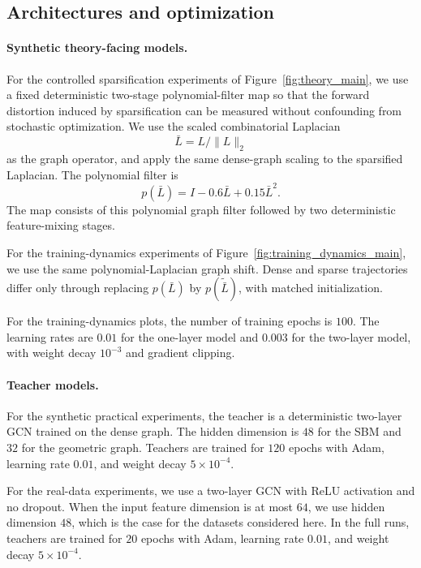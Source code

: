 \documentclass{article}
\begin{document}
\subsection{Architectures and optimization}
\label{app:impl}
\paragraph{Synthetic theory-facing models.}
For the controlled sparsification experiments of Figure~\ref{fig:theory_main}, we use a fixed deterministic two-stage polynomial-filter map so that the forward distortion induced by sparsification can be measured without confounding from stochastic optimization. We use the scaled combinatorial Laplacian
\[
\bar L = L/\|L\|_2
\]
as the graph operator, and apply the same dense-graph scaling to the sparsified Laplacian. The polynomial filter is
\[
p(\bar L)=I-0.6\bar L+0.15\bar L^2.
\]
The map consists of this polynomial graph filter followed by two deterministic feature-mixing stages.

For the training-dynamics experiments of Figure~\ref{fig:training_dynamics_main}, we use the same polynomial-Laplacian graph shift. Dense and sparse trajectories differ only through replacing \(p(\bar L)\) by \(p(\widetilde{\bar L})\), with matched initialization.



For the training-dynamics plots, the number of training epochs is $100$. The learning rates are $0.01$ for the one-layer model and $0.003$ for the two-layer model, with weight decay $10^{-3}$ and gradient clipping.




\paragraph{Teacher models.}
For the synthetic practical experiments, the teacher is a deterministic two-layer GCN trained on the dense graph. The hidden dimension is $48$ for the SBM and $32$ for the geometric graph. Teachers are trained for $120$ epochs with Adam, learning rate $0.01$, and weight decay $5\times 10^{-4}$.

For the real-data experiments, we use a two-layer GCN with ReLU activation and no dropout. When the input feature dimension is at most $64$, we use hidden dimension $48$, which is the case for the datasets considered here. In the full runs, teachers are trained for $20$ epochs with Adam, learning rate $0.01$, and weight decay $5\times 10^{-4}$.
\end{document}
